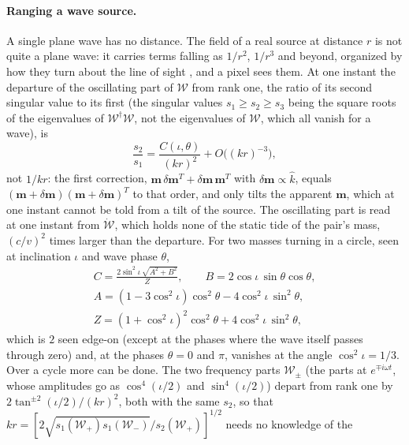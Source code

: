 \paragraph{Ranging a wave source.} A single plane wave has no distance.
The field of a real source at distance $r$ is not quite a plane wave: it carries
terms falling as $1/r^2$, $1/r^3$ and beyond, organized by how they turn about
the line of sight \cite{Sachs1962}, and a pixel sees them. At one instant the
departure of the oscillating part of $\mathcal{W}$ from rank one, the ratio of its
second singular value to its first (the singular values $s_1 \ge s_2 \ge s_3$
being the square roots of the eigenvalues of $\mathcal W^\dagger\mathcal W$, not
the eigenvalues of $\mathcal W$, which all vanish for a wave), is
\begin{equation}\label{eq:ranging-instant}
\frac{s_2}{s_1} = \frac{C(\iota, \theta)}{(kr)^2} + O\bigl((kr)^{-3}\bigr),
\end{equation}
not $1/kr$: the first correction, $\mathbf m\,\delta\mathbf m^T + \delta\mathbf m\,\mathbf m^T$
with $\delta\mathbf m \propto \hat k$, equals $(\mathbf m + \delta\mathbf m)(\mathbf m +
\delta\mathbf m)^T$ to that order, and only tilts the apparent $\mathbf{m}$, which at one
instant cannot be told from a tilt of the source. The oscillating part is read
at one instant from $\dot{\mathcal W}$, which holds none of the static tide of the
pair's mass, $(c/v)^2$ times larger than the departure. For two masses turning in a
circle, seen at inclination $\iota$ and wave phase $\theta$,
\begin{equation}\label{eq:ranging-C}
\begin{gathered}
C = \frac{2\sin^2\!\iota\,\sqrt{A^2 + B^2}}{Z}, \qquad
B = 2\cos\iota\,\sin\theta\cos\theta,\\
A = (1 - 3\cos^2\!\iota)\cos^2\!\theta - 4\cos^2\!\iota\,\sin^2\!\theta,\\
Z = (1 + \cos^2\!\iota)^2\cos^2\!\theta + 4\cos^2\!\iota\,\sin^2\!\theta,
\end{gathered}
\end{equation}
which is $2$ seen edge-on (except at the phases where the wave itself passes
through zero) and, at the phases $\theta = 0$ and $\pi$, vanishes at the angle
$\cos^2\iota = 1/3$. Over a cycle more can be done. The two frequency parts
$\mathcal{W}_\pm$ (the parts at $e^{\mp i\omega t}$, whose amplitudes go as
$\cos^4(\iota/2)$ and $\sin^4(\iota/2)$) depart from rank one by
$2\tan^{\pm2}(\iota/2)/(kr)^2$, both with the same $s_2$, so that
$kr = [2\sqrt{s_1(\mathcal{W}_+)s_1(\mathcal{W}_-)}/s_2(\mathcal{W}_+)]^{1/2}$ needs no knowledge of the
